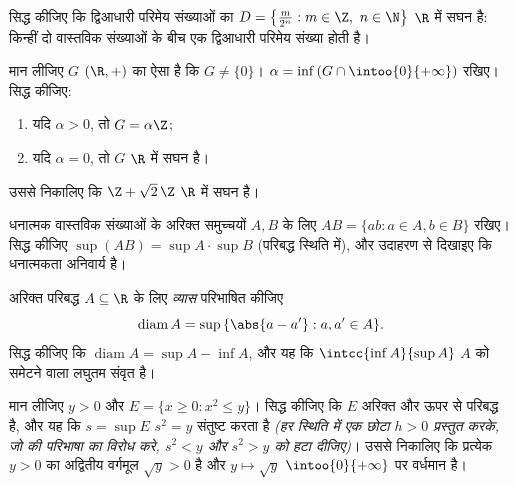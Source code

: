\begin{exercise}[$\star\star$]\label{exo:b1:reals:8}
सिद्ध कीजिए कि द्विआधारी परिमेय संख्याओं का  $D =
\bigl\{\frac{m}{2^n} : m \in \Z,\ n \in \N\bigr\}$ $\R$ में सघन है: किन्हीं
दो वास्तविक संख्याओं के बीच एक द्विआधारी परिमेय संख्या होती है।
\end{exercise}

\begin{exercise}[$\star\star\star$]\label{exo:b1:reals:9}
मान लीजिए $G$ $(\R, +)$ का ऐसा  है कि $G \neq \{0\}$। $\alpha =
\inf\,(G \cap \intoo{0}{+\infty})$ रखिए। सिद्ध कीजिए:
\begin{enumerate}
  \item यदि $\alpha > 0$, तो $G = \alpha\Z$;
  \item यदि $\alpha = 0$, तो $G$ $\R$ में सघन है।
\end{enumerate}
उससे निकालिए कि $\Z + \sqrt 2\,\Z$ $\R$ में सघन है।
\end{exercise}

\begin{exercise}[$\star\star\star$]\label{exo:b1:reals:10}
धनात्मक वास्तविक संख्याओं के अरिक्त समुच्चयों $A, B$ के लिए $AB = \{ab : a
\in A, b \in B\}$ रखिए। सिद्ध कीजिए $\sup(AB) = \sup A \cdot \sup B$
(परिबद्ध स्थिति में), और उदाहरण से दिखाइए कि धनात्मकता अनिवार्य है।
\end{exercise}

\begin{exercise}[$\star\star$]\label{exo:b1:reals:11}
अरिक्त परिबद्ध $A \subseteq \R$ के लिए \emph{व्यास} परिभाषित कीजिए
\[
\operatorname{diam} A = \sup\,\{\abs{a - a'} : a, a' \in A\} .
\]
सिद्ध कीजिए कि $\operatorname{diam} A = \sup A - \inf A$, और यह कि
$\intcc{\inf A}{\sup A}$ $A$ को समेटने वाला लघुतम संवृत  है।
\end{exercise}

\begin{exercise}[$\star\star\star$]\label{exo:b1:reals:12}
मान लीजिए $y > 0$ और $E = \{x \geq 0 : x^2 \leq y\}$। सिद्ध कीजिए कि $E$
अरिक्त और ऊपर से परिबद्ध है, और यह कि $s = \sup E$ $s^2 = y$ संतुष्ट करता है
\emph{(हर स्थिति में एक छोटा $h > 0$ प्रस्तुत करके, जो  की परिभाषा का
विरोध करे, $s^2 < y$ और $s^2 > y$ को हटा दीजिए)}। उससे निकालिए कि प्रत्येक
$y > 0$ का अद्वितीय वर्गमूल $\sqrt y > 0$ है और $y \mapsto \sqrt y$
$\intoo{0}{+\infty}$ पर वर्धमान है।
\end{exercise}

